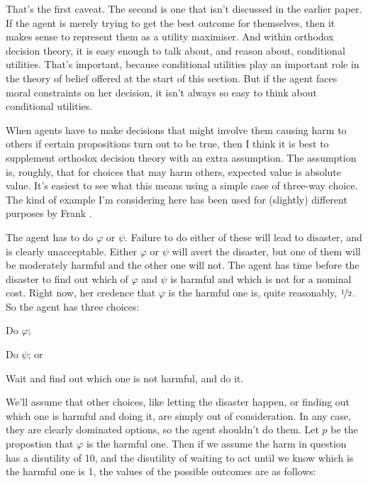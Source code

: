 That's the first caveat. The second is one that isn't discussed in the earlier paper. If the agent is merely trying to get the best outcome for themselves, then it makes sense to represent them as a utility maximiser. And within orthodox decision theory, it is easy enough to talk about, and reason about, conditional utilities. That's important, because conditional utilities play an important role in the theory of belief offered at the start of this section. But if the agent faces moral constraints on her decision, it isn't always so easy to think about conditional utilities.

When agents have to make decisions that might involve them causing harm to others if certain propositions turn out to be true, then I think it is best to supplement orthodox decision theory with an extra assumption. The assumption is, roughly, that for choices that may harm others, expected value is absolute value. It's easiest to see what this means using a simple case of three-way choice. The kind of example I'm considering here has been used for (slightly) different purposes by Frank \cite{Jackson1991}. 

The agent has to do $\varphi$ or $\psi$. Failure to do either of these will lead to disaster, and is clearly unacceptable. Either $\varphi$ or $\psi$ will avert the disaster, but one of them will be moderately harmful and the other one will not. The agent has time before the disaster to find out which of $\varphi$ and $\psi$ is harmful and which is not for a nominal cost. Right now, her credence that $\varphi$ is the harmful one is, quite reasonably, $\nicefrac{1}{2}$. So the agent has three choices:

\begin{itemize*}
\item Do $\varphi$;
\item Do $\psi$; or
\item Wait and find out which one is not harmful, and do it.
\end{itemize*}

\noindent We'll assume that other choices, like letting the disaster happen, or finding out which one is harmful and doing it, are simply out of consideration. In any case, they are clearly dominated options, so the agent shouldn't do them. Let $p$ be the propostion that $\varphi$ is the harmful one. Then if we assume the harm in question has a disutility of 10, and the disutility of waiting to act until we know which is the harmful one is 1, the values of the possible outcomes are as follows:

